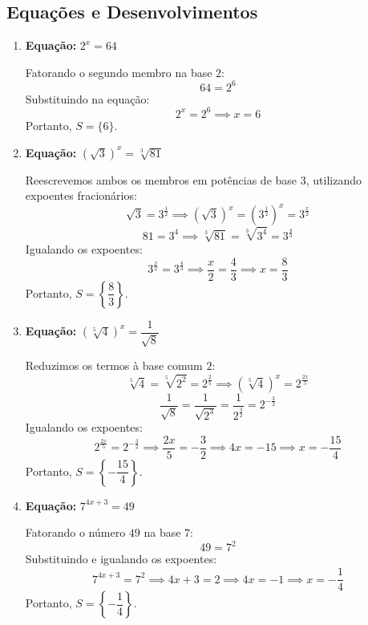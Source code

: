 \documentclass[12pt,a4paper]{report}
\begin{document}
\subsection*{Equações e Desenvolvimentos}

\begin{enumerate}[label=\textbf{\arabic*.}]
	
	\item \textbf{Equação:} $2^x = 64$
	
	Fatorando o segundo membro na base $2$:
	\[
	64 = 2^6
	\]
	Substituindo na equação:
	\[
	2^x = 2^6 \implies x = 6
	\]
	Portanto, $S = \{6\}$.
	
	\vspace{0.5cm}
	
	\item \textbf{Equação:} $\left( \sqrt{3} \right)^x = \sqrt[3]{81}$
	
	Reescrevemos ambos os membros em potências de base $3$, utilizando expoentes fracionários:
	\[
	\sqrt{3} = 3^{\frac{1}{2}} \implies \left( \sqrt{3} \right)^x = \left( 3^{\frac{1}{2}} \right)^x = 3^{\frac{x}{2}}
	\]
	\[
	81 = 3^4 \implies \sqrt[3]{81} = \sqrt[3]{3^4} = 3^{\frac{4}{3}}
	\]
	Igualando os expoentes:
	\[
	3^{\frac{x}{2}} = 3^{\frac{4}{3}} \implies \frac{x}{2} = \frac{4}{3} \implies x = \frac{8}{3}
	\]
	Portanto, $S = \left\{ \dfrac{8}{3} \right\}$.
	
	\vspace{0.5cm}
	
	\item \textbf{Equação:} $\left( \sqrt[5]{4} \right)^x = \dfrac{1}{\sqrt{8}}$
	
	Reduzimos os termos à base comum $2$:
	\[
	\sqrt[5]{4} = \sqrt[5]{2^2} = 2^{\frac{2}{5}} \implies \left( \sqrt[5]{4} \right)^x = 2^{\frac{2x}{5}}
	\]
	\[
	\frac{1}{\sqrt{8}} = \frac{1}{\sqrt{2^3}} = \frac{1}{2^{\frac{3}{2}}} = 2^{-\frac{3}{2}}
	\]
	Igualando os expoentes:
	\[
	2^{\frac{2x}{5}} = 2^{-\frac{3}{2}} \implies \frac{2x}{5} = -\frac{3}{2} \implies 4x = -15 \implies x = -\frac{15}{4}
	\]
	Portanto, $S = \left\{ -\dfrac{15}{4} \right\}$.
	
	\vspace{0.5cm}
	
	\item \textbf{Equação:} $7^{4x+3} = 49$
	
	Fatorando o número $49$ na base $7$:
	\[
	49 = 7^2
	\]
	Substituindo e igualando os expoentes:
	\[
	7^{4x+3} = 7^2 \implies 4x + 3 = 2 \implies 4x = -1 \implies x = -\frac{1}{4}
	\]
	Portanto, $S = \left\{ -\dfrac{1}{4} \right\}$.
	

\end{enumerate}
\end{document}
